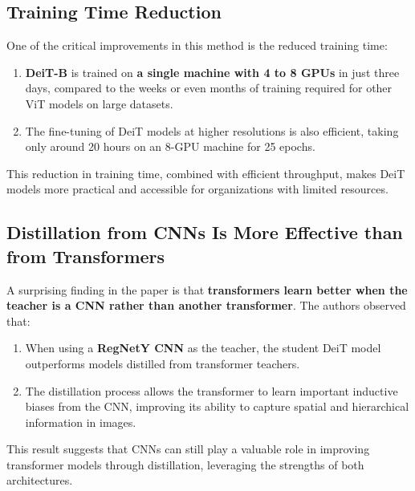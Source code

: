 \documentclass{report}
\begin{document}
	
	\subsection{Training Time Reduction}
	One of the critical improvements in this method is the reduced training time:
	
	\begin{enumerate}
		\item 
		\textbf{DeiT-B} is trained on \textbf{a single machine with 4 to 8 GPUs} in just three days, compared to the weeks or even months of training required for other ViT models on large datasets.
		
		\item 
		The fine-tuning of DeiT models at higher resolutions is also efficient, taking only around 20 hours on an 8-GPU machine for 25 epochs.
	\end{enumerate}
	This reduction in training time, combined with efficient throughput, makes DeiT models more practical and accessible for organizations with limited resources.
	
	
	
	\subsection{Distillation from CNNs Is More Effective than from Transformers}
	A surprising finding in the paper is that \textbf{transformers learn better when the teacher is a CNN rather than another transformer}. The authors observed that:
	
	\begin{enumerate}
		\item 
		When using a \textbf{RegNetY CNN} as the teacher, the student DeiT model outperforms models distilled from transformer teachers.
		
		\item 
		The distillation process allows the transformer to learn important inductive biases from the CNN, improving its ability to capture spatial and hierarchical information in images.
	\end{enumerate}
	
	This result suggests that CNNs can still play a valuable role in improving transformer models through distillation, leveraging the strengths of both architectures.
	
	
	
\end{document}
